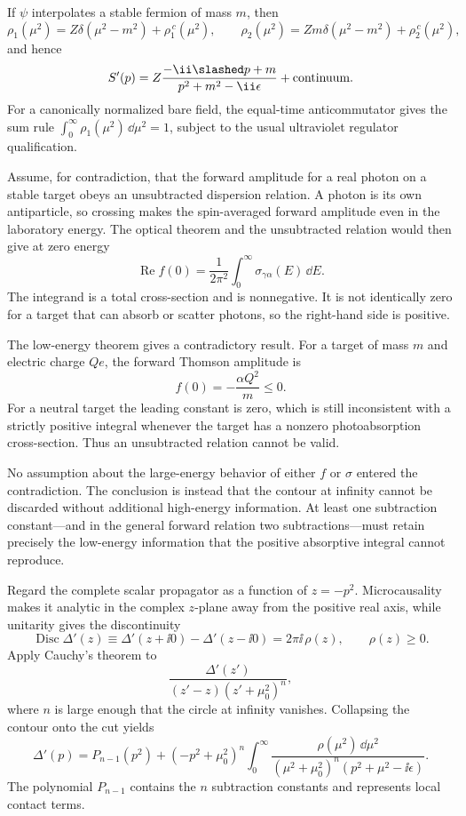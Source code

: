 \begin{enumerate}
If \(\psi\) interpolates a stable fermion of mass \(m\), then
\[
 \rho_1(\mu^2)=Z\delta(\mu^2-m^2)+\rho_1^{\,c}(\mu^2),
\qquad
 \rho_2(\mu^2)=Zm\delta(\mu^2-m^2)+\rho_2^{\,c}(\mu^2),
\]
and hence
\[
 S'(p)=Z\frac{-\ii\slashed p+m}{p^2+m^2-\ii\epsilon}
 +\text{continuum}.
\]
For a canonically normalized bare field, the equal-time
anticommutator gives the sum rule
\(\int_0^\infty\rho_1(\mu^2)\,\dd\mu^2=1\), subject to the usual
ultraviolet regulator qualification.

Assume, for contradiction, that the forward amplitude for a real photon
on a stable target obeys an unsubtracted dispersion relation.  A photon is
its own antiparticle, so crossing makes the spin-averaged forward amplitude
even in the laboratory energy.  The optical theorem and the unsubtracted
relation would then give at zero energy
\[
 \operatorname{Re}f(0)
 =\frac{1}{2\pi^2}\int_0^\infty\sigma_{\gamma\alpha}(E)\,\dd E.
\]
The integrand is a total cross-section and is nonnegative.  It is not
identically zero for a target that can absorb or scatter photons, so the
right-hand side is positive.

The low-energy theorem gives a contradictory result.  For a target of
mass \(m\) and electric charge \(Qe\), the forward Thomson amplitude is
\[
 f(0)=-\frac{\alpha Q^2}{m}\leq0.
\]
For a neutral target the leading constant is zero, which is still
inconsistent with a strictly positive integral whenever the target has a
nonzero photoabsorption cross-section.  Thus an unsubtracted relation
cannot be valid.

No assumption about the large-energy behavior of either \(f\) or
\(\sigma\) entered the contradiction.  The conclusion is instead that the
contour at infinity cannot be discarded without additional high-energy
information.  At least one subtraction constant---and in the general
forward relation two subtractions---must retain precisely the low-energy
information that the positive absorptive integral cannot reproduce.

Regard the complete scalar propagator as a function of
\(z=-p^2\).  Microcausality makes it analytic in the complex \(z\)-plane
away from the positive real axis, while unitarity gives the discontinuity
\[
 \operatorname{Disc}\Delta'(z)
 \equiv\Delta'(z+\ii0)-\Delta'(z-\ii0)
 =2\pi \ii\,\rho(z),\qquad \rho(z)\geq0.
\]
Apply Cauchy's theorem to
\[
 \frac{\Delta'(z')}{(z'-z)(z'+\mu_0^2)^n},
\]
where \(n\) is large enough that the circle at infinity vanishes.
Collapsing the contour onto the cut yields
\[
 \Delta'(p)=P_{n-1}(p^2)
 +(-p^2+\mu_0^2)^n
 \int_0^\infty
 \frac{\rho(\mu^2)\,\dd\mu^2}
 {(\mu^2+\mu_0^2)^n(p^2+\mu^2-\ii\epsilon)}.
\]
The polynomial \(P_{n-1}\) contains the \(n\) subtraction constants and
represents local contact terms.


\end{enumerate}
